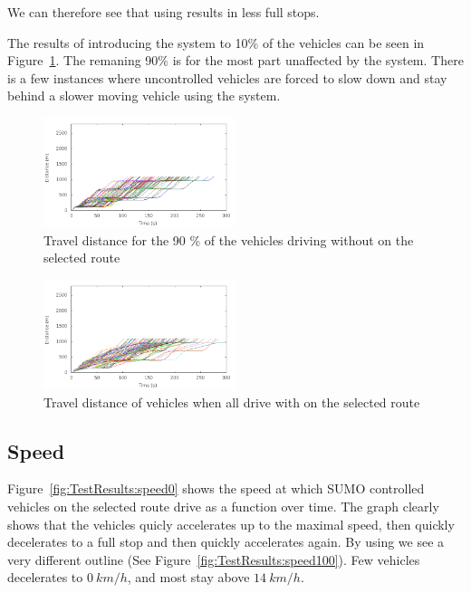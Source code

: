 We can therefore see that using \tech results in less full stops.

The results of introducing the system to 10\% of the vehicles can be seen in Figure~\ref{fig:TestResults:distanceUnC10}. 
The remaning 90\% is for the most part unaffected by the system. 
There is a few instances where uncontrolled vehicles are forced to slow down and stay behind a slower moving vehicle using the system.

\begin{figure}[H]
\includegraphics[width=0.5\textwidth]{../images/tp0/distanceUncontrolled10.png}
\caption{Travel distance for the 90 \% of the vehicles driving without \tech on the selected route}
\label{fig:TestResults:distanceUnC10}
\end{figure}

\begin{figure}[H]
\includegraphics[width=0.5\textwidth]{../images/tp0/distanceControlled100.png}
\caption{Travel distance of vehicles when all drive with \tech on the selected route}
\label{fig:TestResults:distance100}
\end{figure}

\subsection{Speed}
Figure~\ref{fig:TestResults:speed0} shows the speed at which SUMO controlled vehicles on the selected route drive as a function over time.
The graph clearly shows that the vehicles quicly accelerates up to the maximal speed, then quickly decelerates to a full stop and then quickly accelerates again.
By using \tech we see a very different outline (See Figure~\ref{fig:TestResults:speed100}).
Few vehicles decelerates to $0\ km/h$, and most stay above $14\ km/h$.

